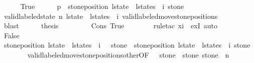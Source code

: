 \begin{isabellebody}
\ \ \ \ \isamarkupfalse%
\ True\isanewline
\ \ \ \ \isamarkupfalse%
\ {\isachardoublequoteopen}p{}\ {\isacharequal}\ stone{\isacharunderscore}position\ {\isacharparenleft}{\isacharparenleft}l{\isacharunderscore}state\ {\isacharhash}\ l{\isacharunderscore}states{\isacharparenright}\ {\isacharbang}\ i{\isacharparenright}\ stone{\isacharprime}{\isachardoublequoteclose}\isanewline
\ \ \ \ \ \ \isamarkupfalse%
\ {\isacharasterisk}{\isacharasterisk}\isanewline
\ \ \ \ \ \ \isamarkupfalse%
\ {\isacartoucheopen}valid{\isacharunderscore}labeled{\isacharunderscore}state\ n\ {\isacharparenleft}{\isacharparenleft}l{\isacharunderscore}state\ {\isacharhash}\ l{\isacharunderscore}states{\isacharparenright}\ {\isacharbang}\ i{\isacharparenright}{\isacartoucheclose}\ valid{\isacharunderscore}labeled{\isacharunderscore}move{\isacharprime}{\isacharunderscore}stone{\isacharunderscore}positions\isanewline
\ \ \ \ \ \ \isamarkupfalse%
\ blast\isanewline
\ \ \ \ \isamarkupfalse%
\ {\isacharquery}thesis\isanewline
\ \ \ \ \ \ \isamarkupfalse%
\ {\isacharasterisk}\ Cons{\isacharparenleft}{}{\isacharparenright}\ True\isanewline
\ \ \ \ \ \ \isamarkupfalse%
\ {\isacharparenleft}rule{\isacharunderscore}tac\ x{\isacharequal}i\ \ exI{\isacharcomma}\ auto{\isacharparenright}\isanewline
\ \ \isamarkupfalse%
\isanewline
\ \ \ \ \isamarkupfalse%
\ False\isanewline
\ \ \ \ \isanewline
\ \ \ \ \isamarkupfalse%
\ {\isachardoublequoteopen}stone{\isacharunderscore}position\ {\isacharparenleft}{\isacharparenleft}l{\isacharunderscore}state\ {\isacharhash}\ l{\isacharunderscore}states{\isacharparenright}\ {\isacharbang}\ {\isacharparenleft}i\ {\isacharplus}\ {}{\isacharparenright}{\isacharparenright}\ stone\ {\isacharequal}\ stone{\isacharunderscore}position\ {\isacharparenleft}{\isacharparenleft}l{\isacharunderscore}state\ {\isacharhash}\ l{\isacharunderscore}states{\isacharparenright}\ {\isacharbang}\ i{\isacharparenright}\ stone{\isachardoublequoteclose}\isanewline
\ \ \ \ \ \ \isamarkupfalse%
\ valid{\isacharunderscore}labeled{\isacharunderscore}move{\isacharprime}{\isacharunderscore}stone{\isacharunderscore}positions{\isacharunderscore}other{\isacharbrackleft}OF\ {\isacharasterisk}{\isacharasterisk}{\isacharasterisk}\ {\isacharasterisk}{\isacharasterisk}{\isacharbrackright}\ {\isacharbackquoteopen}stone{\isacharprime}\ {\isasymnoteq}\ stone{\isacharbackquoteclose}\ {\isacharbackquoteopen}stone\ {\isacharless}\ n{\isacharbackquoteclose}\isanewline

\end{isabellebody}
